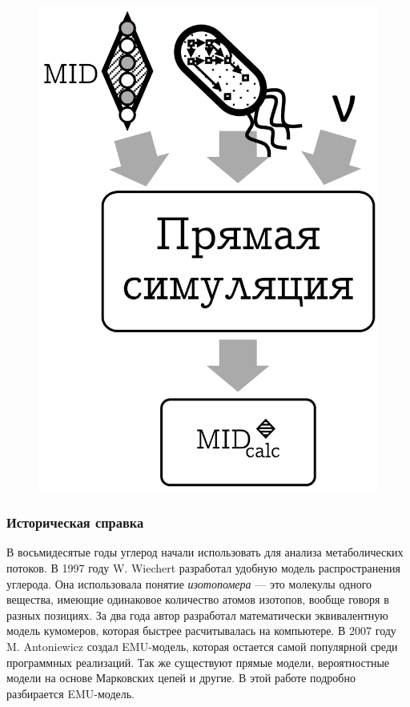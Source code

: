 \documentclass[14pt, a4paper]{extreport}
\begin{document}
\begin{multicols}{2}[]
	\begin{figure}[H]
		\includegraphics[width=0.9\linewidth]{direct_simulation.png}
		\label{direct_simulation}
	\end{figure}
	\subsubsection{Историческая справка}
	В восьмидесятые годы углерод начали использовать для анализа метаболических потоков. В 1997 году	
	W. Wiechert разработал удобную модель распространения углерода. Она использовала понятие \emph{изотопомера} --- это молекулы одного вещества, имеющие одинаковое количество атомов изотопов, вообще говоря в разных позициях. За два года автор разработал математически эквивалентную модель кумомеров, которая быстрее расчитывалась на компьютере. В 2007 году M. Antoniewicz создал EMU-модель, которая остается самой популярной среди программных реализаций. Так же существуют прямые модели\cite{Direct_MFA}, вероятностные модели на основе Марковских цепей\cite{Markov_chain_MFA} и другие\cite{Fluxomer_MFA}. В этой работе подробно разбирается EMU-модель.
\end{multicols}
\end{document}
